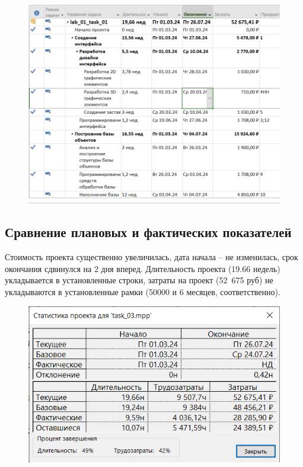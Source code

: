 \begin{figure}[h!]
	\begin{center}
		\includegraphics[scale=0.6]{inc/img/p_26.png}
	\end{center}
	\captionsetup{justification=centering}
	\label{fig:u3}
\end{figure}

\subsection*{Сравнение плановых и фактических показателей}

Стоимость проекта существенно увеличилась, дата
начала – не изменилась, срок окончания сдвинулся на 2 дня вперед. Длительность проекта (19.66 недель) укладывается в установленные строки, затраты на проект (52~675 руб) не укладываются в установленные рамки (50000 и 6 месяцев, соответственно).

\begin{figure}[h!]
	\begin{center}
		\includegraphics[scale=0.7]{inc/img/p_27.png}
	\end{center}
	\captionsetup{justification=centering}
	\label{fig:u3}
\end{figure}

